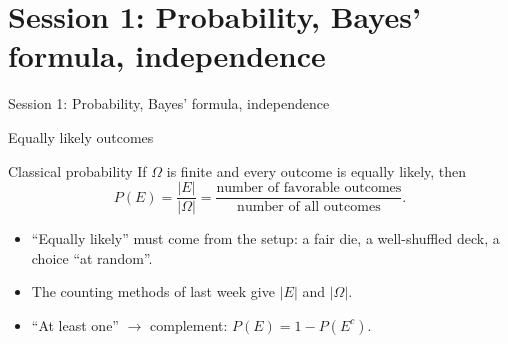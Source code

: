 \documentclass[aspectratio=169,11pt,usepdftitle=false]{beamer}
\newcommand{\Om}{\Omega}
\begin{document}
\section{Session 1: Probability, Bayes' formula, independence}

\begin{frame}
  \centering\Large\color{navy}Session 1: Probability, Bayes' formula,
  independence
\end{frame}

\begin{frame}{Equally likely outcomes}
  \begin{block}{Classical probability}
    If $\Om$ is finite and every outcome is equally likely, then
    \[ P(E)=\frac{|E|}{|\Om|}=\frac{\text{number of favorable outcomes}}
      {\text{number of all outcomes}}. \]
  \end{block}
  \begin{itemize}
    \item ``Equally likely'' must come from the setup: a fair die, a
          well-shuffled deck, a choice ``at random''.
    \item The counting methods of last week give $|E|$ and $|\Om|$.
    \item ``At least one'' $\to$ complement: $P(E)=1-P(E^c)$.
  \end{itemize}
\end{frame}
\end{document}
